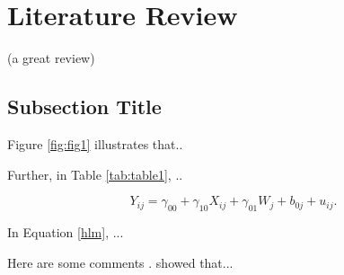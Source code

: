 \section{Literature Review}\label{review1}

(a great review)

\subsection{Subsection Title}



Figure \ref{fig:fig1} illustrates that..
\newpage


Further, in Table \ref{tab:table1}, ..

\newpage
\begin{equation}\label{hlm}
    Y_{ij} = \gamma_{00} + \gamma_{10}X_{ij} + \gamma_{01}W_j + b_{0j} + u_{ij}.
\end{equation}

In Equation \ref{hlm}, ...
\newpage

Here are some comments \parencite{hoffman_interpretation_2019}. \textcite{hoffman_interpretation_2019} showed that...
\newpage